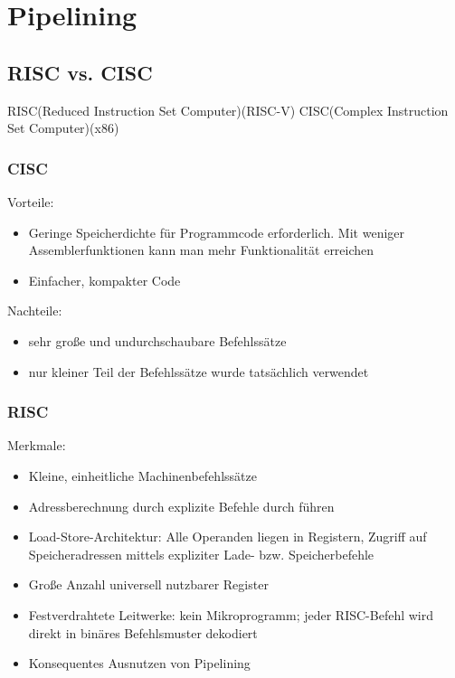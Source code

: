 \section{Pipelining}
	\subsection{RISC vs. CISC}
		RISC(Reduced Instruction Set Computer)(RISC-V) \newline
		CISC(Complex Instruction Set Computer)(x86)
		\subsubsection{CISC}
			Vorteile: \newline
			\begin{itemize}
				\item Geringe Speicherdichte für Programmcode erforderlich. Mit weniger Assemblerfunktionen kann man mehr Funktionalität erreichen
				\item Einfacher, kompakter Code
			\end{itemize}
			Nachteile: \newline
			\begin{itemize}
				\item sehr große und undurchschaubare Befehlssätze
				\item nur kleiner Teil der Befehlssätze wurde tatsächlich verwendet
			\end{itemize}
		\subsubsection{RISC}	
			Merkmale: \newline
			\begin{itemize}
				\item Kleine, einheitliche Machinenbefehlssätze
				\item Adressberechnung durch explizite Befehle durch führen
				\item Load-Store-Architektur: Alle Operanden liegen in Registern, Zugriff auf Speicheradressen mittels expliziter Lade- bzw. Speicherbefehle
				\item Große Anzahl universell nutzbarer Register
				\item Festverdrahtete Leitwerke: kein Mikroprogramm; jeder RISC-Befehl wird direkt in binäres Befehlsmuster dekodiert
				\item Konsequentes Ausnutzen von Pipelining
			\end{itemize}
